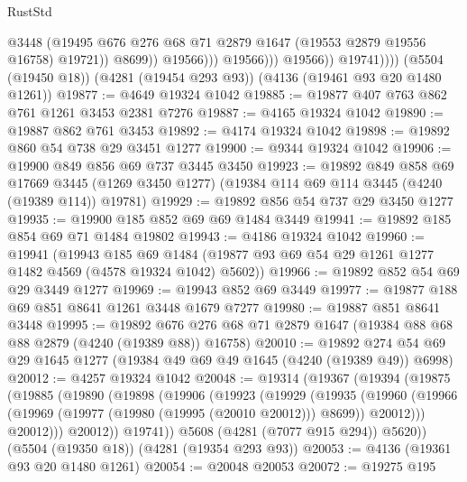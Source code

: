 \begin{lexlean}{RustStd}
\begin{coremodule}
{\begin{coremodule}
{{{{{{{{{{{{{{{{{{{{{{{{{{{{{{{{{{{                                  @3448
                                  (@19495
                                    @676
                                    @276
                                    @68
                                    @71
                                    @2879
                                    @1647
                                    (@19553 @2879 @19556 @16758)
                                    @19721))
                                @8699))
                            @19566)))
                      @19566)))
                @19566))
            @19741))))
    (@5504 (@19450 @18))
    (@4281 (@19454 @293 @93))
    (@4136 (@19461 @93 @20 @1480 @1261))
@19877 := @4649 @19324 @1042
@19885 := @19877 @407 @763 @862 @761 @1261 @3453 @2381 @7276
@19887 := @4165 @19324 @1042
@19890 := @19887 @862 @761 @3453
@19892 := @4174 @19324 @1042
@19898 := @19892 @860 @54 @738 @29 @3451 @1277
@19900 := @9344 @19324 @1042
@19906 := @19900 @849 @856 @69 @737 @3445 @3450
@19923 := @19892
    @849
    @858
    @69
    @17669
    @3445
    (@1269 @3450 @1277)
    (@19384 @114 @69 @114 @3445 (@4240 (@19389 @114)) @19781)
@19929 := @19892 @856 @54 @737 @29 @3450 @1277
@19935 := @19900 @185 @852 @69 @69 @1484 @3449
@19941 := @19892 @185 @854 @69 @71 @1484 @19802
@19943 := @4186 @19324 @1042
@19960 := @19941
    (@19943
      @185
      @69
      @1484
      (@19877 @93 @69 @54 @29 @1261 @1277 @1482 @4569 (@4578 @19324 @1042) @5602))
@19966 := @19892 @852 @54 @69 @29 @3449 @1277
@19969 := @19943 @852 @69 @3449
@19977 := @19877 @188 @69 @851 @8641 @1261 @3448 @1679 @7277
@19980 := @19887 @851 @8641 @3448
@19995 := @19892
    @676
    @276
    @68
    @71
    @2879
    @1647
    (@19384 @88 @68 @88 @2879 (@4240 (@19389 @88)) @16758)
@20010 := @19892 @274 @54 @69 @29 @1645 @1277 (@19384 @49 @69 @49 @1645 (@4240 (@19389 @49)) @6998)
@20012 := @4257 @19324 @1042
@20048 := @19314
    (@19367
      (@19394
        (@19875
          (@19885
            (@19890
              (@19898
                (@19906
                  (@19923
                    (@19929
                      (@19935
                        (@19960
                          (@19966
                            (@19969 (@19977 (@19980 (@19995 (@20010 @20012))) @8699))
                            @20012)))
                      @20012)))
                @20012))
            @19741))
        @5608
        (@4281 (@7077 @915 @294))
        @5620))
    (@5504 (@19350 @18))
    (@4281 (@19354 @293 @93))
@20053 := @4136 (@19361 @93 @20 @1480 @1261)
@20054 := @20048 @20053
@20072 := @19275
    @195
}}}}}}}}}}}}}}}}}}}}}}}}}}}}}}}}}}}
\end{coremodule}}
\end{coremodule}
\end{lexlean}
